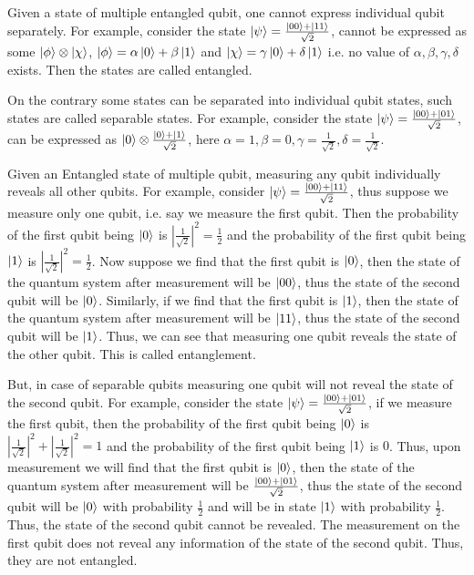 Given a state of multiple entangled qubit, one cannot express individual qubit separately.
For example, consider the state $\ket{\psi} = \frac{\ket{00}+\ket{11}}{\sqrt{2}}$, cannot be expressed as some $\ket{\phi} \otimes \ket{\chi}$,
$\ket{\phi}=\alpha \ket{0} + \beta \ket{1}$ and $\ket{\chi}=\gamma \ket{0} + \delta \ket{1}$ i.e. no value of $\alpha, \beta, \gamma, \delta$ exists. Then the states are called entangled.

On the contrary some states can be separated into individual qubit states, such states are called separable states.
For example, consider the state $\ket{\psi} = \frac{\ket{00}+\ket{01}}{\sqrt{2}}$, can be expressed as $\ket{0} \otimes \frac{\ket{0}+\ket{1}}{\sqrt{2}}$, here
$\alpha =1 ,\beta =0,\gamma = \frac{1}{\sqrt{2}},\delta = \frac{1}{\sqrt{2}}$.

Given an Entangled state of multiple qubit, measuring any qubit individually reveals all other qubits. 
For example, consider $\ket{\psi}=\frac{\ket{00}+\ket{11}}{\sqrt{2}}$, thus suppose we measure only one qubit, i.e.
say we measure the first qubit. Then the probability of the first qubit being $\ket{0}$ is $|\frac{1}{\sqrt{2}}|^2=\frac{1}{2}$ and the probability of the first qubit being $\ket{1}$ is $|\frac{1}{\sqrt{2}}|^2=\frac{1}{2}$.
Now suppose we find that the first qubit is $\ket{0}$, then the state of the quantum system after measurement will be $\ket{00}$, thus the state of the second qubit will be $\ket{0}$.
Similarly, if we find that the first qubit is $\ket{1}$, then the state of the quantum system after measurement will be $\ket{11}$, thus the state of the second qubit will be $\ket{1}$.
Thus, we can see that measuring one qubit reveals the state of the other qubit. This is called entanglement.

But, in case of separable qubits measuring one qubit will not reveal the state of the second qubit. For example, consider the state $\ket{\psi}=\frac{\ket{00}+\ket{01}}{\sqrt{2}}$,
if we measure the first qubit, then the probability of the first qubit being $\ket{0}$ is $|\frac{1}{\sqrt{2}}|^2+|\frac{1}{\sqrt{2}}|^2=1$ and the probability of the first qubit being $\ket{1}$ is $0$.
Thus, upon measurement we will find that the first qubit is $\ket{0}$, then the state of the quantum system after measurement will be $\frac{\ket{00}+\ket{01}}{\sqrt{2}}$, thus the state of the second qubit will be $\ket{0}$ with probability $\frac{1}{2}$ and 
will be in state $\ket{1}$ with probability $\frac{1}{2}$. Thus, the state of the second qubit cannot be revealed. The measurement on the first qubit does not reveal any information of the state of the second qubit. Thus, they are not entangled.

